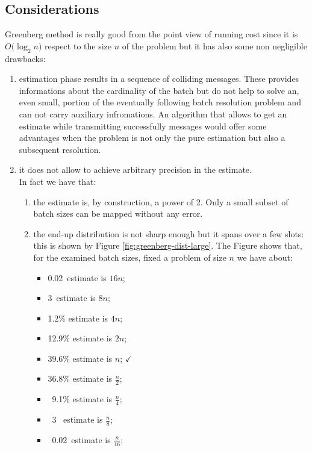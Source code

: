 \documentclass[11pt,a4paper,twoside,openright]{book}
\begin{document}
\subsection{Considerations}
Greenberg method is really good from the point view of running cost since it is $O\bigl(\log_{2}n\bigr)$ respect to the size  $n$ of the problem but it has also some non negligible drawbacks:
\begin{enumerate}[\bf a)]
\item estimation phase results in a sequence of colliding messages. These provides informations about the cardinality of the batch but do not help to solve an, even small, portion of the eventually following batch resolution problem and can not carry auxiliary infromations. An algorithm that allows to get an estimate while transmitting successfully messages would offer some advantages when the problem is not only the pure estimation but also a subsequent resolution.
\item it does not allow to achieve arbitrary precision in the estimate.\\ In fact we have that:
	\begin{enumerate}[\it i.]
		\item  the estimate is, by construction, a power of 2. Only a small subset of batch sizes can be mapped without any error.
		\item the end-up distribution is not sharp enough but it spans over a few slots: this is shown by Figure \ref{fig:greenberg-dist-large}. The Figure shows that, for the examined batch sizes, fixed a problem of size $n$ we have about:
		\begin{itemize}
		\item 0.02\textpertenthousand\  estimate is $16n$;
		\item 3\textpertenthousand\  estimate is $8n$;
		\item 1.2\% estimate is $4n$;
		\item 12.9\% estimate is $2n$;
		\item 39.6\% estimate is $n$; $\checkmark$
		\item 36.8\% estimate is $\frac{n}{2}$;
		\item \ 9.1\% estimate is $\frac{n}{4}$;
		\item \  3 \textperthousand\ estimate is $\frac{n}{8}$;
		\item \ 0.02\textpertenthousand\ estimate is $\frac{n}{16}$;

\end{itemize}
\end{enumerate}
\end{enumerate}
\end{document}

